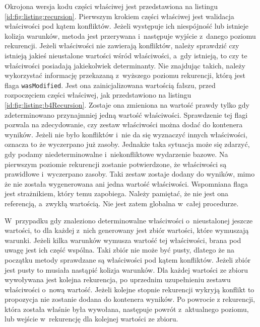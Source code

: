 \documentclass[a4paper]{book}
\begin{document}
{Okrojona wersja kodu części właściwej jest przedstawiona na listingu \ref{id:fig:listing:recursion}. Pierwszym krokiem części właściwej jest walidacja właściwości pod kątem konfliktów. Jeżeli występuje ich niespójność lub istnieje kolizja warunków, metoda jest przerywana i~następuje wyjście z~danego poziomu rekurencji. Jeżeli właściwości nie zawierają konfliktów, należy sprawdzić czy istnieją jakieś nieustalone wartości wśród właściwości, a~gdy istnieją, to czy te właściwości posiadają jakiekolwiek determinanty. Nie znajdując takich, należy wykorzystać informację przekazaną z~wyższego poziomu rekurencji, którą jest flaga \lstinline|wasModified|. Jest ona zainicjalizowana wartością fałszu, przed rozpoczęciem części właściwej, jak przedstawiono na listingu \ref{id:fig:listing:b4Recursion}. Zostaje ona zmieniona na wartość prawdy tylko gdy zdeterminowano przynajmniej jedną wartość właściwości. Sprawdzenie tej flagi pozwala na zdecydowanie, czy zestaw właściwości można dodać do kontenera wyników. Jeżeli nie było konfliktów i~nie da się wyznaczyć innych właściwości, oznacza to że wyczerpano już zasoby. Jednakże taka sytuacja może się zdarzyć, gdy podamy niedeterminowalne i~niekonfliktowe wydarzenie bazowe. Na pierwszym poziomie rekurencji zostanie potwierdzone, że właściwości są prawidłowe i~wyczerpano zasoby. Taki zestaw zostaje dodany do wyników, mimo że nie została wygenerowana ani jedna wartość właściwości. Wspomniana flaga jest strażnikiem, który temu zapobiega. Należy pamiętać, że nie jest ona referencją, a~zwykłą wartością. Nie jest zatem globalna w~całej procedurze.

W~przypadku gdy znaleziono determinowalne właściwości o~nieustalonej jeszcze wartości, to dla każdej z~nich generowany jest zbiór wartości, które wymuszają warunki. Jeżeli kilka warunków wymusza wartość tej właściwości, brana pod uwagę jest ich część wspólna. Taki zbiór nie może być pusty, dlatego że na początku metody sprawdzane są właściwości pod kątem konfliktów. Jeżeli zbiór jest pusty to musiała nastąpić kolizja warunków. Dla każdej wartości ze zbioru wywoływana jest kolejna rekurencja, po uprzednim uzupełnieniu zestawu właściwości o~nową wartość. Jeżeli kolejne stopnie rekurencji wykryją konflikt to propozycja nie zostanie dodana do kontenera wyników. Po powrocie z rekurencji, która została właśnie była wywołana, następuje powrót z~aktualnego poziomu, lub wejście w~rekurencję dla kolejnej wartości ze zbioru.

}
\end{document}

